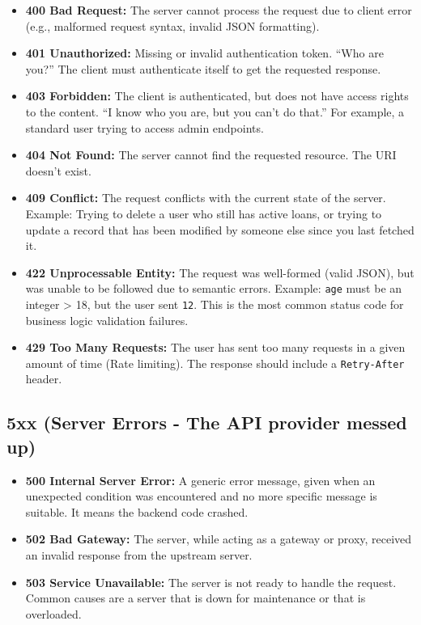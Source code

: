 \documentclass[
  11pt,
  openany,
  oneside]{book}
\providecommand{\tightlist}{%
  \setlength{\itemsep}{0pt}\setlength{\parskip}{0pt}}
\begin{document}
\begin{itemize}
\tightlist
\item
  \textbf{400 Bad Request:} The server cannot process the request due to
  client error (e.g., malformed request syntax, invalid JSON
  formatting).
\item
  \textbf{401 Unauthorized:} Missing or invalid authentication token.
  ``Who are you?'' The client must authenticate itself to get the
  requested response.
\item
  \textbf{403 Forbidden:} The client is authenticated, but does not have
  access rights to the content. ``I know who you are, but you can't do
  that.'' For example, a standard user trying to access admin endpoints.
\item
  \textbf{404 Not Found:} The server cannot find the requested resource.
  The URI doesn't exist.
\item
  \textbf{409 Conflict:} The request conflicts with the current state of
  the server. Example: Trying to delete a user who still has active
  loans, or trying to update a record that has been modified by someone
  else since you last fetched it.
\item
  \textbf{422 Unprocessable Entity:} The request was well-formed (valid
  JSON), but was unable to be followed due to semantic errors. Example:
  \texttt{age} must be an integer \textgreater{} 18, but the user sent
  \texttt{12}. This is the most common status code for business logic
  validation failures.
\item
  \textbf{429 Too Many Requests:} The user has sent too many requests in
  a given amount of time (Rate limiting). The response should include a
  \texttt{Retry-After} header.
\end{itemize}

\subsection{5xx (Server Errors - The API provider messed
up)}\label{xx-server-errors---the-api-provider-messed-up}

\begin{itemize}
\tightlist
\item
  \textbf{500 Internal Server Error:} A generic error message, given
  when an unexpected condition was encountered and no more specific
  message is suitable. It means the backend code crashed.
\item
  \textbf{502 Bad Gateway:} The server, while acting as a gateway or
  proxy, received an invalid response from the upstream server.
\item
  \textbf{503 Service Unavailable:} The server is not ready to handle
  the request. Common causes are a server that is down for maintenance
  or that is overloaded.
\end{itemize}
\end{document}
